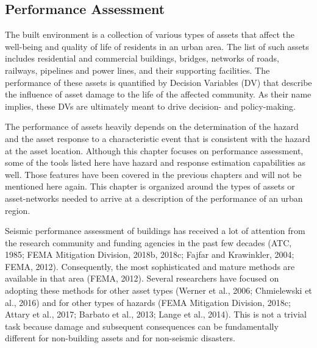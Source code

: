 
\begin{partbacktext}
\part{Performance Assessment}\label{part:Performance}

The built environment is a collection of various types of assets that affect the well-being and quality of life of residents in an urban area. The list of such assets includes residential and commercial buildings, bridges, networks of roads, railways, pipelines and power lines, and their supporting facilities. The performance of these assets is quantified by Decision Variables (DV) that describe the influence of asset damage to the life of the affected community. As their name implies, these DVs are ultimately meant to drive decision- and policy-making.

The performance of assets heavily depends on the determination of the hazard and the asset response to a characteristic event that is consistent with the hazard at the asset location. Although this chapter focuses on performance assessment, some of the tools listed here have hazard and response estimation capabilities as well. Those features have been covered in the previous chapters and will not be mentioned here again. This chapter is organized around the types of assets or asset-networks needed to arrive at a description of the performance of an urban region. 

Seismic performance assessment of buildings has received a lot of attention from the research community and funding agencies in the past few decades (ATC, 1985; FEMA Mitigation Division, 2018b, 2018c; Fajfar and Krawinkler, 2004; FEMA, 2012). Consequently, the most sophisticated and mature methods are available in that area (FEMA, 2012). Several researchers have focused on adopting these methods for other asset types (Werner et al., 2006; Chmielewski et al., 2016) and for other types of hazards (FEMA Mitigation Division, 2018c; Attary et al., 2017; Barbato et al., 2013; Lange et al., 2014). This is not a trivial task because damage and subsequent consequences can be fundamentally different for non-building assets and for non-seismic disasters.  

\end{partbacktext}